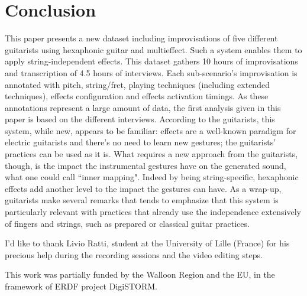 \documentclass{article}
\begin{document}
\section{Conclusion}\label{sec:conclusion}
This paper presents a new dataset including improvisations of five different guitarists using hexaphonic guitar and multieffect. Such a system enables them to apply string-independent effects. This dataset gathers 10 hours of improvisations and transcription of 4.5 hours of interviews. 
Each sub-scenario's improvisation is annotated with pitch, string/fret, playing techniques (including extended techniques), effects configuration and effects activation timings. As these annotations represent a large amount of data, the first analysis given in this paper is based on the different interviews. According to the guitarists, this system, while new, appears to be familiar: effects are a well-known paradigm for electric guitarists and there's no need to learn new gestures; the guitarists' practices can be used as it is. What requires a new approach from the guitarists, though, is the impact the instrumental gestures have on the generated sound, what one could call ``inner mapping".  Indeed by being string-specific, hexaphonic effects add another level to the impact the gestures can have.
As a wrap-up, guitarists make several remarks that tends to emphasize that this system is particularly relevant with practices that already use the independence extensively of fingers and strings, such as prepared or classical guitar practices.



\begin{acknowledgments}
I'd like to thank Livio Ratti, student at the University of Lille (France) for his precious help during the recording sessions and the video editing steps. 

This work was partially funded by the Walloon Region and the EU, in the framework of ERDF project DigiSTORM.
\end{acknowledgments} 


\end{document}
